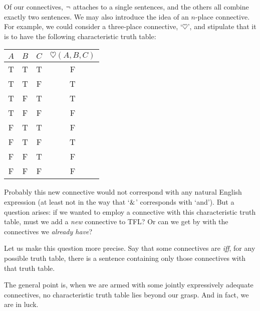Of our connectives, $\neg$ attaches to a single sentences, and the others all combine exactly two sentences. We may also introduce the idea of an $n$-place connective. For example, we could consider a three-place connective, `$\heartsuit$', and stipulate that it is to have the following characteristic truth table:
\begin{center}
\begin{tabular}{c c c | c}
$A$ & $B$ & $C$ & $\heartsuit(A,B,C)$\\
\hline
 T & T & T & F \\
 T & T & F & T \\
 T & F & T & T \\
 T & F & F & F \\
 F & T & T & F \\
 F & T & F & T \\
 F & F & T & F \\
 F & F & F & F
\end{tabular}
\end{center}
Probably this new connective would not correspond with any natural English expression (at least not in the way that `$\mathbin{\&}$' corresponds with `and'). But a question arises: if we wanted to employ a connective with this characteristic truth table, must we add a \emph{new} connective to TFL? Or can we get by with the connectives we \emph{already have}?

Let us make this question more precise. Say that some connectives are  \emph{iff}, for any possible truth table, there is a sentence containing only those connectives with that truth table.


The general point is, when we are armed with some jointly expressively adequate connectives, no characteristic truth table lies beyond our grasp. And in fact, we are in luck.

